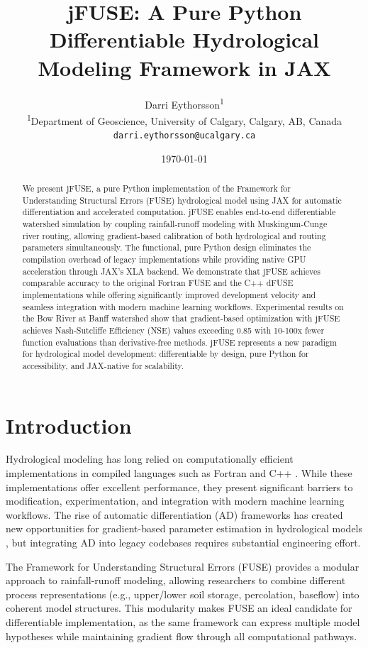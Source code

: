 \documentclass[11pt,a4paper]{article}
\title{jFUSE: A Pure Python Differentiable Hydrological Modeling Framework in JAX}
\author{
    Darri Eythorsson\textsuperscript{1}\\
    \textsuperscript{1}Department of Geoscience, University of Calgary, Calgary, AB, Canada\\
    \texttt{darri.eythorsson@ucalgary.ca}
}
\date{\today}
\begin{document}
\maketitle

\begin{abstract}
We present jFUSE, a pure Python implementation of the Framework for Understanding Structural Errors (FUSE) hydrological model using JAX for automatic differentiation and accelerated computation. jFUSE enables end-to-end differentiable watershed simulation by coupling rainfall-runoff modeling with Muskingum-Cunge river routing, allowing gradient-based calibration of both hydrological and routing parameters simultaneously. The functional, pure Python design eliminates the compilation overhead of legacy implementations while providing native GPU acceleration through JAX's XLA backend. We demonstrate that jFUSE achieves comparable accuracy to the original Fortran FUSE and the C++ dFUSE implementations while offering significantly improved development velocity and seamless integration with modern machine learning workflows. Experimental results on the Bow River at Banff watershed show that gradient-based optimization with jFUSE achieves Nash-Sutcliffe Efficiency (NSE) values exceeding 0.85 with 10-100x fewer function evaluations than derivative-free methods. jFUSE represents a new paradigm for hydrological model development: differentiable by design, pure Python for accessibility, and JAX-native for scalability.
\end{abstract}

\section{Introduction}

Hydrological modeling has long relied on computationally efficient implementations in compiled languages such as Fortran and C++ \citep{clark2008framework}. While these implementations offer excellent performance, they present significant barriers to modification, experimentation, and integration with modern machine learning workflows. The rise of automatic differentiation (AD) frameworks has created new opportunities for gradient-based parameter estimation in hydrological models \citep{shen2018differentiable}, but integrating AD into legacy codebases requires substantial engineering effort.

The Framework for Understanding Structural Errors (FUSE) \citep{clark2008framework} provides a modular approach to rainfall-runoff modeling, allowing researchers to combine different process representations (e.g., upper/lower soil storage, percolation, baseflow) into coherent model structures. This modularity makes FUSE an ideal candidate for differentiable implementation, as the same framework can express multiple model hypotheses while maintaining gradient flow through all computational pathways.
\end{document}
